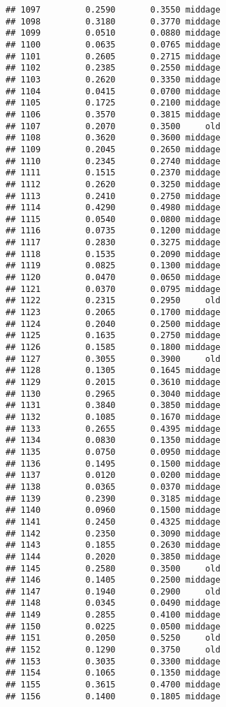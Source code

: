 \documentclass[
]{article}
\begin{document}
\begin{verbatim}
## 1097         0.2590       0.3550 middage
## 1098         0.3180       0.3770 middage
## 1099         0.0510       0.0880 middage
## 1100         0.0635       0.0765 middage
## 1101         0.2605       0.2715 middage
## 1102         0.2385       0.2550 middage
## 1103         0.2620       0.3350 middage
## 1104         0.0415       0.0700 middage
## 1105         0.1725       0.2100 middage
## 1106         0.3570       0.3815 middage
## 1107         0.2070       0.3500     old
## 1108         0.3620       0.3600 middage
## 1109         0.2045       0.2650 middage
## 1110         0.2345       0.2740 middage
## 1111         0.1515       0.2370 middage
## 1112         0.2620       0.3250 middage
## 1113         0.2410       0.2750 middage
## 1114         0.4290       0.4980 middage
## 1115         0.0540       0.0800 middage
## 1116         0.0735       0.1200 middage
## 1117         0.2830       0.3275 middage
## 1118         0.1535       0.2090 middage
## 1119         0.0825       0.1300 middage
## 1120         0.0470       0.0650 middage
## 1121         0.0370       0.0795 middage
## 1122         0.2315       0.2950     old
## 1123         0.2065       0.1700 middage
## 1124         0.2040       0.2500 middage
## 1125         0.1635       0.2750 middage
## 1126         0.1585       0.1800 middage
## 1127         0.3055       0.3900     old
## 1128         0.1305       0.1645 middage
## 1129         0.2015       0.3610 middage
## 1130         0.2965       0.3040 middage
## 1131         0.3840       0.3850 middage
## 1132         0.1085       0.1670 middage
## 1133         0.2655       0.4395 middage
## 1134         0.0830       0.1350 middage
## 1135         0.0750       0.0950 middage
## 1136         0.1495       0.1500 middage
## 1137         0.0120       0.0200 middage
## 1138         0.0365       0.0370 middage
## 1139         0.2390       0.3185 middage
## 1140         0.0960       0.1500 middage
## 1141         0.2450       0.4325 middage
## 1142         0.2350       0.3090 middage
## 1143         0.1855       0.2630 middage
## 1144         0.2020       0.3850 middage
## 1145         0.2580       0.3500     old
## 1146         0.1405       0.2500 middage
## 1147         0.1940       0.2900     old
## 1148         0.0345       0.0490 middage
## 1149         0.2855       0.4100 middage
## 1150         0.0225       0.0500 middage
## 1151         0.2050       0.5250     old
## 1152         0.1290       0.3750     old
## 1153         0.3035       0.3300 middage
## 1154         0.1065       0.1350 middage
## 1155         0.3615       0.4700 middage
## 1156         0.1400       0.1805 middage

\end{verbatim}
\end{document}
